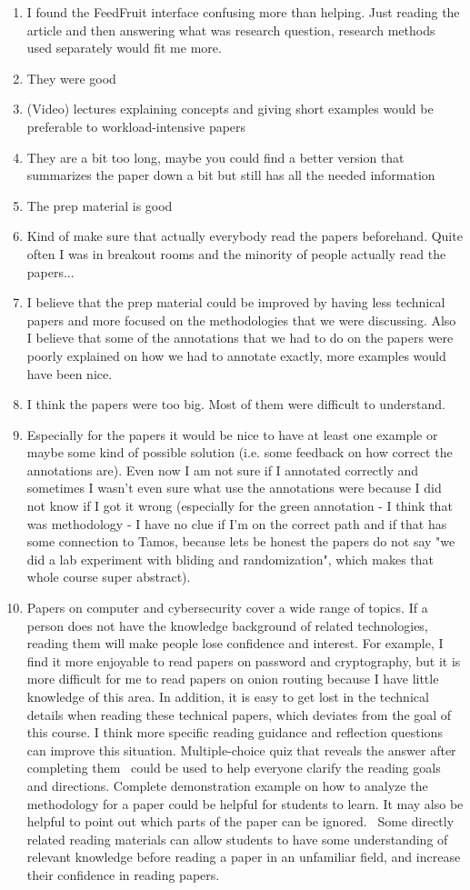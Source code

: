 \documentclass[a4paper]{report}
\begin{document}
\begin{enumerate}
  \item I found the FeedFruit interface confusing more than helping. Just reading the article and then answering what was research question, research methods used separately would fit me more.
  \item They were good 
  \item (Video) lectures explaining concepts and giving short examples would be preferable to workload-intensive papers
  \item They are a bit too long, maybe you could find a better version that summarizes the paper down a bit but still has all the needed information
  \item The prep material is good
  \item Kind of make sure that actually everybody read the papers beforehand. Quite often I was in breakout rooms and the minority of people actually read the papers...
  \item I believe that the prep material could be improved by having less technical papers and more focused on the methodologies that we were discussing. Also I believe that some of the annotations that we had to do on the papers were poorly explained on how we had to annotate exactly, more examples would have been nice.
  \item I think the papers were too big. Most of them were difficult to understand. 
  \item Especially for the papers it would be nice to have at least one example or maybe some kind of possible solution (i.e. some feedback on how correct the annotations are). Even now I am not sure if I annotated correctly and sometimes I wasn't even sure what use the annotations were because I did not know if I got it wrong (especially for the green annotation - I think that was methodology - I have no clue if I'm on the correct path and if that has some connection to Tamos, because lets be honest the papers do not say "we did a lab experiment with bliding and randomization", which makes that whole course super abstract).
  \item Papers on computer and cybersecurity cover a wide range of topics. If a person does not have the knowledge background of related technologies, reading them will make people lose confidence and interest. For example, I find it more enjoyable to read papers on password and cryptography, but it is more difficult for me to read papers on onion routing because I have little knowledge of this area. In addition, it is easy to get lost in the technical details when reading these technical papers, which deviates from the goal of this course.  I think more specific reading guidance and reflection questions can improve this situation. Multiple-choice quiz that reveals the answer after completing them  could be used to help everyone clarify the reading goals and directions. Complete demonstration example on how to analyze the methodology for a paper could be helpful for students to learn. It may also be helpful to point out which parts of the paper can be ignored.   Some directly related reading materials can allow students to have some understanding of relevant knowledge before reading a paper in an unfamiliar field, and increase their confidence in reading papers.

\end{enumerate}
\end{document}
